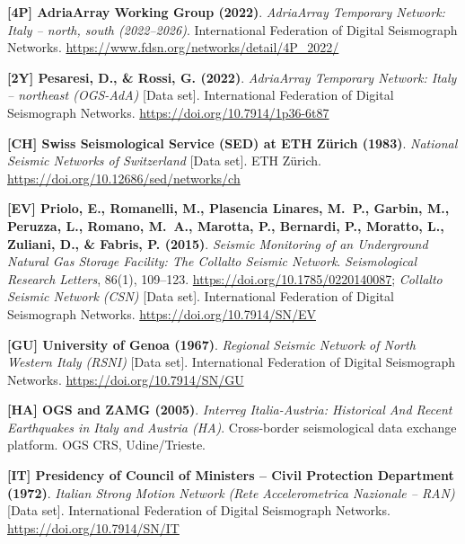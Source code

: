 \begin{enumerate}[label={[\textbf{\arabic*}]},leftmargin=*]
  \item \textbf{[4P] AdriaArray Working Group (2022)}.
    \textit{AdriaArray Temporary Network: Italy -- north, south (2022--2026)}.
    International Federation of Digital Seismograph Networks.
    \url{https://www.fdsn.org/networks/detail/4P_2022/}

  \item \textbf{[2Y] Pesaresi, D., \& Rossi, G. (2022)}.
    \textit{AdriaArray Temporary Network: Italy -- northeast
    (OGS-AdA)} [Data set].
    International Federation of Digital Seismograph Networks.
    \url{https://doi.org/10.7914/1p36-6t87}

  \item \textbf{[CH] Swiss Seismological Service (SED) at ETH Z\"urich (1983)}.
    \textit{National Seismic Networks of Switzerland} [Data set].
    ETH Z\"urich.
    \url{https://doi.org/10.12686/sed/networks/ch}

  \item \textbf{[EV] Priolo, E., Romanelli, M., Plasencia Linares,
      M.~P., Garbin, M., Peruzza, L., Romano, M.~A., Marotta, P.,
    Bernardi, P., Moratto, L., Zuliani, D., \& Fabris, P. (2015)}.
    \textit{Seismic Monitoring of an Underground Natural Gas Storage
    Facility: The Collalto Seismic Network}.
    \textit{Seismological Research Letters}, 86(1), 109--123.
    \url{https://doi.org/10.1785/0220140087};
    \textit{Collalto Seismic Network (CSN)} [Data set].
    International Federation of Digital Seismograph Networks.
    \url{https://doi.org/10.7914/SN/EV}

  \item \textbf{[GU] University of Genoa (1967)}.
    \textit{Regional Seismic Network of North Western Italy (RSNI)} [Data set].
    International Federation of Digital Seismograph Networks.
    \url{https://doi.org/10.7914/SN/GU}

  \item \textbf{[HA] \ac{OGS} and ZAMG (2005)}.
    \textit{Interreg Italia-Austria: Historical And Recent
    Earthquakes in Italy and Austria (HA)}.
    Cross-border seismological data exchange platform.
    \ac{OGS} \acf{CRS}, Udine/Trieste.

  \item \textbf{[IT] Presidency of Council of Ministers -- Civil
    Protection Department (1972)}.
    \textit{Italian Strong Motion Network (Rete Accelerometrica
    Nazionale -- RAN)} [Data set].
    International Federation of Digital Seismograph Networks.
    \url{https://doi.org/10.7914/SN/IT}


\end{enumerate}
